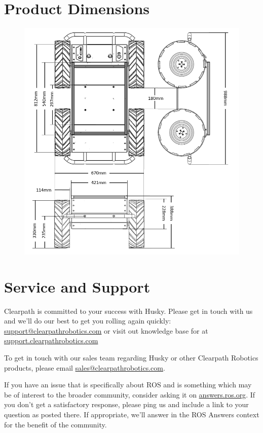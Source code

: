 \documentclass[]{clearpath-latex/clearpath-manual}
\begin{document}
\newpage
\section{Product Dimensions}

\begin{figure}[h]
	\centering
	\includegraphics[width=.9\textwidth]{husky-dimensions.png}
\end{figure}
\newpage
\section{Service and Support}
Clearpath is committed to your success with Husky. Please get in touch with us and we'll
do our best to get you rolling again quickly: \href{mailto:support@clearpathrobotics.com}{support@clearpathrobotics.com}
or visit out knowledge base for at \href{http://support.clearpathrobotics.com}{support.clearpathrobotics.com}

To get in touch with our sales team regarding Husky or other Clearpath Robotics products, please
email \href{mailto:sales@clearpathrobotics.com}{sales@clearpathrobotics.com}.

If you have an issue that is specifically about ROS and is something which may be of interest
to the broader community, consider asking it on \href{http://answers.ros.org}{answers.ros.org}.
If you don't get a satisfactory response, please ping us and include a link to your question
as posted there. If appropriate, we'll answer in the ROS Answers context for the benefit of the
community.
\end{document}
